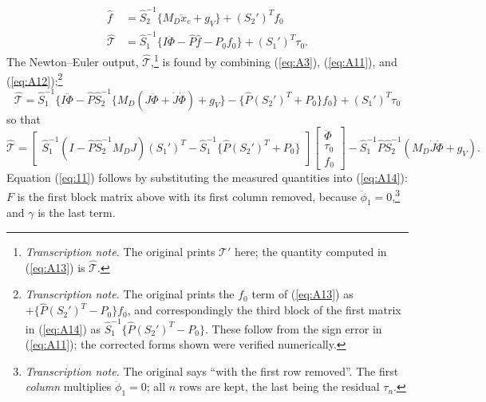 \documentclass[11pt]{article}
\newcommand{\tnote}[1]{\footnote{\textit{Transcription note.} #1}}
\begin{document}
\begin{align}
\hat{f} &= \hat{S}_2^{-1}\{M_D\ddot{x}_c + g_V\} + (S_2')^Tf_0
\label{eq:A11}\\
\hat{\mathcal{T}} &= \hat{S}_1^{-1}\{I\ddot{\Phi} - \hat{P}\hat{f}
- P_0 f_0\} + (S_1')^T\tau_0. \label{eq:A12}
\end{align}
The Newton--Euler output, $\hat{\mathcal{T}}$,\tnote{The original prints
$\mathcal{T}'$ here; the quantity computed in (\ref{eq:A13}) is
$\hat{\mathcal{T}}$.} is found by combining (\ref{eq:A3}), (\ref{eq:A11}),
and (\ref{eq:A12}):\tnote{The original prints the $f_0$ term of
(\ref{eq:A13}) as $+\{\hat{P}(S_2')^T-P_0\}f_0$, and correspondingly the
third block of the first matrix in (\ref{eq:A14}) as
$\hat{S}_1^{-1}\{\hat{P}(S_2')^T-P_0\}$. These follow from the sign
error in (\ref{eq:A11}); the corrected forms shown were verified
numerically.}
\begin{equation}
\hat{\mathcal{T}} = \hat{S}_1^{-1}\big\{I\ddot{\Phi}
- \hat{P}\hat{S}_2^{-1}\{M_D(J\ddot{\Phi} + \dot{J}\dot{\Phi})
+ g_V\} - \{\hat{P}(S_2')^T + P_0\}f_0\big\} + (S_1')^T\tau_0
\label{eq:A13}
\end{equation}
so that
\begin{equation}
\hat{\mathcal{T}} = \begin{bmatrix}
\hat{S}_1^{-1}(I - \hat{P}\hat{S}_2^{-1}M_DJ) (S_1')^T -\hat{S}_1^{-1}\{\hat{P}(S_2')^T + P_0\}
\end{bmatrix}
\begin{bmatrix}\ddot{\Phi}\\ \tau_0\\ f_0\end{bmatrix}
- \hat{S}_1^{-1}\hat{P}\hat{S}_2^{-1}(M_D\dot{J}\dot{\Phi} + g_V).
\label{eq:A14}
\end{equation}
Equation (\ref{eq:11}) follows by substituting the measured quantities into
(\ref{eq:A14}): $F$ is the first block matrix above with its first column
removed, because $\ddot{\phi}_1=0$,\tnote{The original says ``with the first
row removed''. The first \emph{column} multiplies $\ddot{\phi}_1=0$; all $n$
rows are kept, the last being the residual $\tau_n$.} and $\gamma$ is the
last term.
\end{document}
